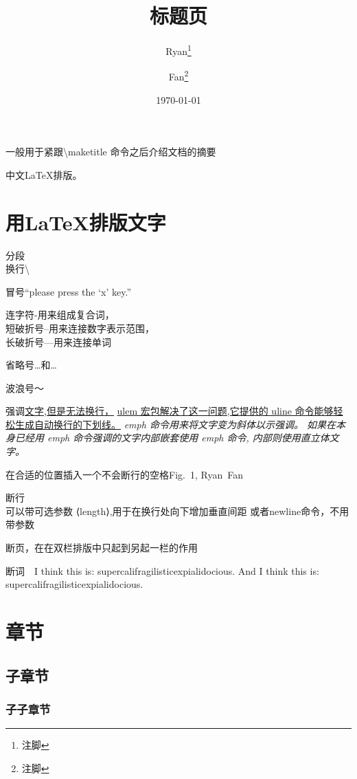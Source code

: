 \documentclass[a4paper]{ctexart}
\begin{document}
    \title{标题页}
    \author{Ryan\thanks{注脚}%
        \and Fan\thanks{注脚}%
        }
    \date{\today}
    \maketitle
    \abstract
    一般用于紧跟\textbackslash maketitle 命令之后介绍文档的摘要\par
    中文\LaTeX{}排版。
    \section{用\LaTeX 排版文字}
    {}分段\\换行\textbackslash\par
    冒号``please press the `x' key.''\par
    连字符-用来组成复合词，\\%
    短破折号--用来连接数字表示范围，\\%
    长破折号---用来连接单词\par
    省略号\dots{}和\ldots\par
    波浪号～\par
    强调\underline{文字,但是无法换行，}%
    \uline{ulem 宏包解决了这一问题,它提供的 uline 命令能够轻松生成自动换行的下划线。}%
    \emph{emph 命令用来将文字变为斜体以示强调。%
        \emph{如果在本身已经用 emph 命令强调的文字内部嵌套使用 emph 命令,}%
        内部则使用直立体文字。%
        }\par
    在合适的位置插入一个不会断行的空格Fig.~1, Ryan~Fan\par
    断行\\[15pt]可以带可选参数 ⟨length⟩,用于在换行处向下增加垂直间距%
    \newline{}或者newline命令，不用带参数\par
    \newpage 断页，在在双栏排版中只起到另起一栏的作用\par
    断词　I think this is: supercalifragil\-isticexpialidocious. %
    And I think this is: supercalifragilisticexpialidocious.\par
    \newpage
    \tableofcontents
    \section[目录和页眉页脚]{章节}
    \subsection{子章节}
    \subsubsection{子子章节}
\end{document}
